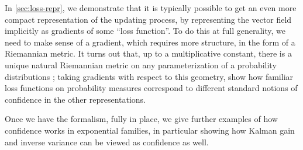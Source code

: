 In \cref{sec:loss-repr}, we demonstrate that it is typically possible to get an even more compact representation of the updating process, by representing the vector field implicitly as gradients of some ``loss function''.
To do this at full generality, we need to make sense of a gradient, which requires more structure, in the form of a Riemannian metric.  It turns out that, up to a multiplicative constant, there is a unique natural Riemannian metric on any parameterization of a probability distributions \cite{chentsov}; taking gradients with respect to this geometry, show how familiar loss functions on probability measures correspond to different standard notions of confidence in the other representations.

Once we have the formalism, fully in place, we give further examples of how confidence works in exponential families, in particular showing how Kalman gain and inverse variance can be viewed as confidence as well.








